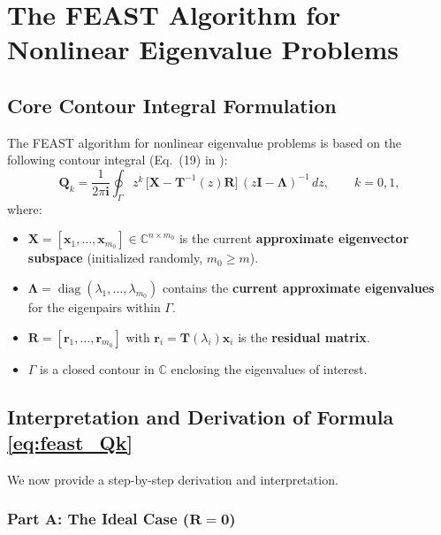 \documentclass[12pt,a4paper]{article}
\theoremstyle{definition}
\DeclareMathOperator{\diag}{diag}
\begin{document}
\section{The FEAST Algorithm for Nonlinear Eigenvalue Problems}

\subsection{Core Contour Integral Formulation}

The FEAST algorithm for nonlinear eigenvalue problems \cite{Polizzi2009,Gavin2018,Brenneck2020} is based on the following contour integral (Eq.~(19) in \cite{Li2025}):
\begin{equation}\label{eq:feast_Qk}
\boxed{\mathbf{Q}_k = \frac{1}{2\pi\mathbf{i}} \oint_{\Gamma} z^{k}\,\bigl[\mathbf{X} - \mathbf{T}^{-1}(z)\mathbf{R}\bigr]\,(z\mathbf{I} - \mathbf{\Lambda})^{-1}\,dz, \qquad k = 0, 1},
\end{equation}
where:
\begin{itemize}[itemsep=2pt]
    \item $\mathbf{X} = [\mathbf{x}_1, \ldots, \mathbf{x}_{m_0}] \in \mathbb{C}^{n \times m_0}$ is the current \textbf{approximate eigenvector subspace} (initialized randomly, $m_0 \geq m$).
    \item $\mathbf{\Lambda} = \diag(\lambda_1, \ldots, \lambda_{m_0})$ contains the \textbf{current approximate eigenvalues} for the eigenpairs within $\Gamma$.
    \item $\mathbf{R} = [\mathbf{r}_1, \ldots, \mathbf{r}_{m_0}]$ with $\mathbf{r}_i = \mathbf{T}(\lambda_i)\mathbf{x}_i$ is the \textbf{residual matrix}.
    \item $\Gamma$ is a closed contour in $\mathbb{C}$ enclosing the eigenvalues of interest.
\end{itemize}

\subsection{Interpretation and Derivation of Formula \eqref{eq:feast_Qk}}

We now provide a step-by-step derivation and interpretation.

\subsubsection*{Part A: The Ideal Case ($\mathbf{R} = \mathbf{0}$)}
\end{document}
